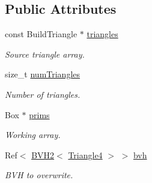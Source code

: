 \subsection*{Public Attributes}
\begin{DoxyCompactItemize}
\item 
\hypertarget{classembree_1_1_b_v_h2_builder_afd3fecbcf0fdc61b11eedd12c4f4f590}{
const BuildTriangle $\ast$ \hyperlink{classembree_1_1_b_v_h2_builder_afd3fecbcf0fdc61b11eedd12c4f4f590}{triangles}}
\label{classembree_1_1_b_v_h2_builder_afd3fecbcf0fdc61b11eedd12c4f4f590}

\begin{DoxyCompactList}\small\item\em Source triangle array. \item\end{DoxyCompactList}\item 
\hypertarget{classembree_1_1_b_v_h2_builder_a2abbd7a4aaa44e93f4eadbcff1eb9ac3}{
size\_\-t \hyperlink{classembree_1_1_b_v_h2_builder_a2abbd7a4aaa44e93f4eadbcff1eb9ac3}{numTriangles}}
\label{classembree_1_1_b_v_h2_builder_a2abbd7a4aaa44e93f4eadbcff1eb9ac3}

\begin{DoxyCompactList}\small\item\em Number of triangles. \item\end{DoxyCompactList}\item 
Box $\ast$ \hyperlink{classembree_1_1_b_v_h2_builder_af5518b0fb73c620d89cde68bbb60022a}{prims}
\begin{DoxyCompactList}\small\item\em Working array. \item\end{DoxyCompactList}\item 
\hypertarget{classembree_1_1_b_v_h2_builder_ac904eaa6d0a4172a1b4fb63d4948ea17}{
Ref$<$ \hyperlink{classembree_1_1_b_v_h2}{BVH2}$<$ \hyperlink{structembree_1_1_triangle4}{Triangle4} $>$ $>$ \hyperlink{classembree_1_1_b_v_h2_builder_ac904eaa6d0a4172a1b4fb63d4948ea17}{bvh}}
\label{classembree_1_1_b_v_h2_builder_ac904eaa6d0a4172a1b4fb63d4948ea17}

\begin{DoxyCompactList}\small\item\em BVH to overwrite. \item\end{DoxyCompactList}\end{DoxyCompactItemize}


